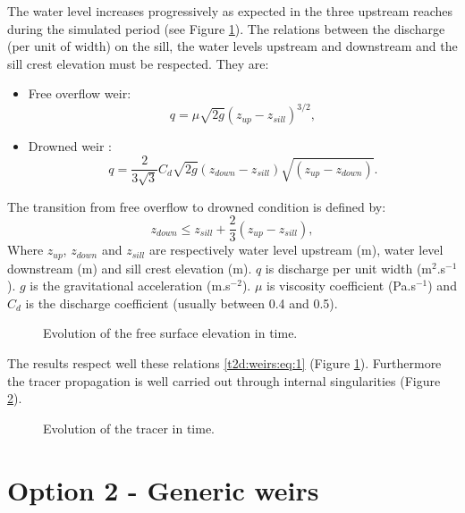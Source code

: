 The water level increases progressively as expected
in the three upstream reaches during the simulated period
(see Figure \ref{t2d:weirs:fig:z}). The relations between
the discharge (per unit of width) on the sill, the water levels
upstream and downstream and the sill crest elevation must be respected.
They are:
\begin{itemize}
\item Free overflow weir:
\begin{equation*}
q=\mu \sqrt{2g}\left( z_{up}-z_{sill} \right)^{3/2},
\end{equation*}
\item Drowned weir :
 	\begin{equation*}
q=\frac{2}{3\sqrt{3}}C_{d} \sqrt{2g}\left( z_{down}-z_{sill} \right)\sqrt{\left( z_{up}-z_{down} \right)}.
\end{equation*}
\end{itemize}
The transition from free overflow to drowned condition is defined by:
\begin{equation}
  	z_{down} \leq z_{sill}+ \frac{2}{3}\left( z_{up}-z_{sill} \right),
  	\label{t2d:weirs:eq:1}
\end{equation}
Where $z_{up}$, $z_{down}$ and $z_{sill}$ are respectively
water level upstream (m), water level downstream (m) and
sill crest elevation (m).  $q$ is discharge per unit width
(m$^2$.s$^{-1}$). $g$ is the gravitational acceleration (m.s$^{-2}$).
$\mu$ is viscosity coefficient (Pa.s$^{-1}$) and $C_d$ is the discharge coefficient
(usually between 0.4 and 0.5).

\begin{figure}[H]
 \centering
 \caption{Evolution of the free surface elevation in time.}
 \label{t2d:weirs:fig:z}
\end{figure}

The  results respect well these relations \eqref{t2d:weirs:eq:1}
(Figure  \ref{t2d:weirs:fig:z}). Furthermore the tracer propagation is well
 carried out through internal singularities (Figure \ref{t2d:weirs:fig:tracer}).

\begin{figure}[H]
 \centering
 \caption{Evolution of the tracer in time.}
 \label{t2d:weirs:fig:tracer}
\end{figure}

\section{Option 2 - Generic weirs}

